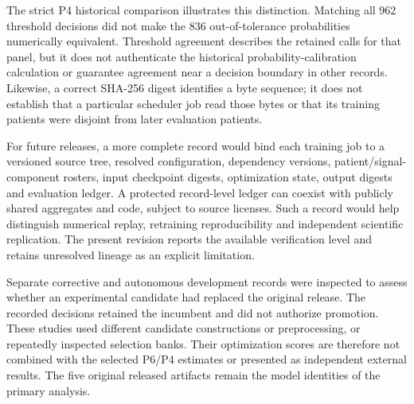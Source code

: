 The strict P4 historical comparison illustrates this distinction. Matching all 962 threshold decisions did not make the 836 out-of-tolerance probabilities numerically equivalent. Threshold agreement describes the retained calls for that panel, but it does not authenticate the historical probability-calibration calculation or guarantee agreement near a decision boundary in other records. Likewise, a correct SHA-256 digest identifies a byte sequence; it does not establish that a particular scheduler job read those bytes or that its training patients were disjoint from later evaluation patients.

For future releases, a more complete record would bind each training job to a versioned source tree, resolved configuration, dependency versions, patient/signal-component rosters, input checkpoint digests, optimization state, output digests and evaluation ledger. A protected record-level ledger can coexist with publicly shared aggregates and code, subject to source licenses. Such a record would help distinguish numerical replay, retraining reproducibility and independent scientific replication. The present revision reports the available verification level and retains unresolved lineage as an explicit limitation.

Separate corrective and autonomous development records were inspected to assess whether an experimental candidate had replaced the original release. The recorded decisions retained the incumbent and did not authorize promotion. These studies used different candidate constructions or preprocessing, or repeatedly inspected selection banks. Their optimization scores are therefore not combined with the selected P6/P4 estimates or presented as independent external results. The five original released artifacts remain the model identities of the primary analysis.
